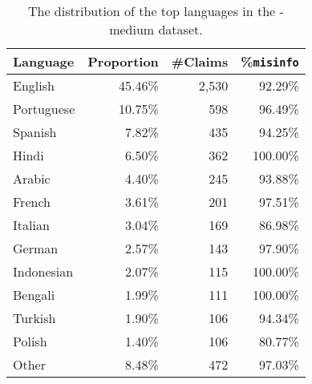\documentclass[sigconf,natbib=true,anonymous=false,nonacm]{acmart}
\begin{document}
\begin{table}[H]
    \caption{The distribution of the top languages in the \datasetname-medium
    dataset.}
    \begin{center}
        \begin{tabular}{lrrr}
            \toprule
            \textbf{Language} &
            \textbf{Proportion} &
            \textbf{\#Claims} &
            \textbf{\%\texttt{misinfo}} \\

            \midrule

            English & 45.46\% & 2,530 & 92.29\% \\
            Portuguese & 10.75\% & 598 & 96.49\% \\
            Spanish & 7.82\% & 435 & 94.25\% \\
            Hindi & 6.50\% & 362 & 100.00\% \\
            Arabic & 4.40\% & 245 & 93.88\% \\
            French & 3.61\% & 201 & 97.51\% \\
            Italian & 3.04\% & 169 & 86.98\% \\
            German & 2.57\% & 143 & 97.90\% \\
            Indonesian & 2.07\% & 115 & 100.00\% \\
            Bengali & 1.99\% & 111 & 100.00\% \\
            Turkish & 1.90\% & 106 & 94.34\% \\
            Polish & 1.40\% & 106 & 80.77\% \\
            Other & 8.48\% & 472 & 97.03\% \\
            \bottomrule
        \end{tabular}
        \label{tab:muminmediumstats}
    \end{center}
\end{table}
\end{document}
